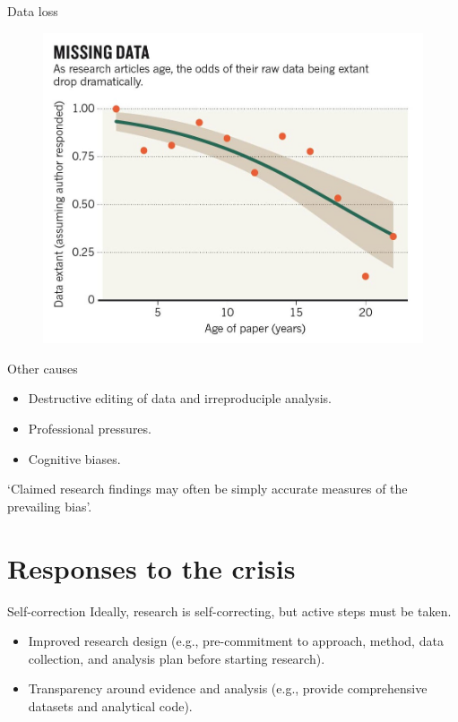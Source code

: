 \documentclass[aspectratio=169, 11pt]{beamer} %
\begin{document}
\begin{frame}{Data loss}
 \begin{figure}[H]
    \centering
        \includegraphics[height=.75\textheight]{figures/Missing-Data.png}
        \caption{\cite{Vines2014-zr}}
        \label{fig:vines2014}
 \end{figure}
\end{frame}

\begin{frame}{Other causes}
    \begin{itemize}[label=\textbullet]
        \item Destructive editing of data and irreproduciple analysis.
        \item Professional pressures.
        \item Cognitive biases.
    \end{itemize}
    `Claimed research findings may often be simply accurate measures of the prevailing bias'. \cite{Alberts2015-nq} \par
\end{frame}

\section{Responses to the crisis}

\begin{frame}{Self-correction}
Ideally, research is self-correcting, but active steps must be taken.
    \begin{itemize}[label=\textbullet]
        \item Improved research design (e.g., pre-commitment to approach, method, data collection, and analysis plan before starting research).
        \item Transparency around evidence and analysis (e.g., provide comprehensive datasets and analytical code).
    \end{itemize}
\end{frame}
\end{document}
